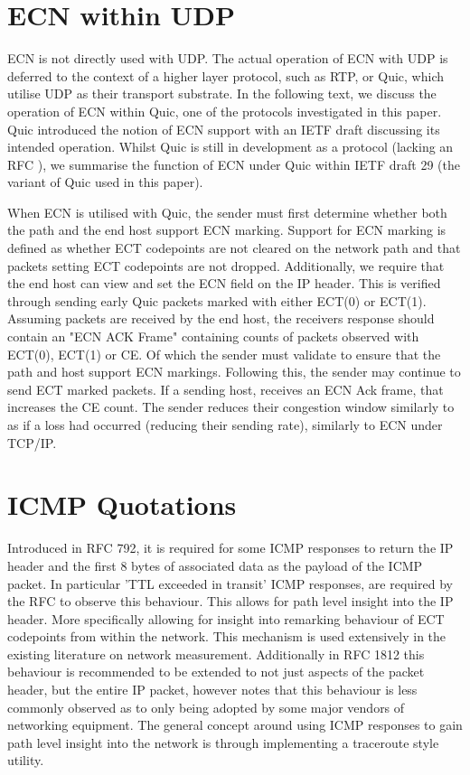 \documentclass{l4proj}
\begin{document}
\section{ECN within UDP}

ECN is not directly used with UDP. The actual operation of ECN with UDP is deferred to the context of a higher layer protocol, such as RTP, or Quic, which utilise UDP as their transport substrate. In the following text, we discuss the operation of ECN within Quic, one of the protocols investigated in this paper. Quic introduced the notion of ECN support with an IETF draft \cite{johansson_ecn_2017} discussing its intended operation. Whilst Quic is still in development as a protocol (lacking an RFC ), we summarise the function of ECN under Quic within IETF draft 29 (the variant of Quic used in this paper).

When ECN is utilised with Quic, the sender must first determine whether both the path and the end host support ECN marking. Support for ECN marking is defined as whether ECT codepoints are not cleared on the network path and that packets setting ECT codepoints are not dropped. Additionally, we require that the end host can view and set the ECN field on the IP header. This is verified through sending early Quic packets marked with either ECT(0) or ECT(1). Assuming packets are received by the end host, the receivers response should contain an "ECN ACK Frame" containing counts of packets observed with ECT(0), ECT(1) or CE. Of which the sender must validate to ensure that the path and host support ECN markings. Following this, the sender may continue to send ECT marked packets. If a sending host, receives an ECN Ack frame, that increases the CE count. The sender reduces their congestion window similarly to as if a loss had occurred (reducing their sending rate), similarly to ECN under TCP/IP.

\section{ICMP Quotations}
\label{sec:icmp}

Introduced in RFC 792, it is required for some ICMP responses to return the IP header and the first 8 bytes of associated data as the payload of the ICMP packet. In particular 'TTL exceeded in transit' ICMP responses, are required by the RFC to observe this behaviour. This allows for path level insight into the IP header. More specifically allowing for insight into remarking behaviour of ECT codepoints from within the network. This mechanism is used extensively in the existing literature on network measurement. Additionally in RFC 1812 this behaviour is recommended to be extended to not just aspects of the packet header, but the entire IP packet, however \cite{noauthor_tracebox_nodate} notes that this behaviour is less commonly observed as to only being adopted by some major vendors of networking equipment. The general concept around using ICMP responses to gain path level insight into the network is through implementing a traceroute style utility.
\end{document}
